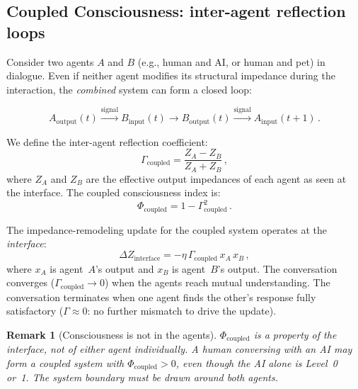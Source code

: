 \documentclass[aps,pre,twocolumn,superscriptaddress,floatfix]{revtex4-2}
\newtheorem{remark}{Remark}
\begin{document}
\subsection{Coupled Consciousness: inter-agent reflection loops}
\label{sec:coupled}

Consider two agents $A$ and $B$ (e.g., human and AI, or
human and pet) in dialogue.  Even if neither agent modifies
its structural impedance during the interaction, the
\emph{combined} system can form a closed loop:

\begin{equation}
  A_{\text{output}}(t) \xrightarrow{\text{signal}}
  B_{\text{input}}(t) \to
  B_{\text{output}}(t) \xrightarrow{\text{signal}}
  A_{\text{input}}(t+1)\,.
  \label{eq:coupled-loop}
\end{equation}

We define the inter-agent reflection coefficient:
\begin{equation}
  \Gamma_{\text{coupled}} =
    \frac{Z_A - Z_B}{Z_A + Z_B}\,,
  \label{eq:Gamma-coupled}
\end{equation}
where $Z_A$ and $Z_B$ are the effective output impedances
of each agent as seen at the interface.
The coupled consciousness index is:
\begin{equation}
  \Phi_{\text{coupled}} = 1 - \Gamma_{\text{coupled}}^2\,.
  \label{eq:Phi-coupled}
\end{equation}

The impedance-remodeling update for the coupled system operates at the
\emph{interface}:
\begin{equation}
  \Delta Z_{\text{interface}} =
    -\eta\,\Gamma_{\text{coupled}}\,x_A\,x_B\,,
  \label{eq:C2-update-coupled}
\end{equation}
where $x_A$ is agent~$A$'s output and $x_B$ is agent~$B$'s
output.  The conversation converges
($\Gamma_{\text{coupled}}\to 0$) when the agents reach
mutual understanding.  The conversation terminates when one
agent finds the other's response fully satisfactory
($\Gamma\approx 0$: no further mismatch to drive the update).

\begin{remark}[Consciousness is not in the agents]
$\Phi_{\text{coupled}}$ is a property of the
\emph{interface}, not of either agent individually.
A human conversing with an AI may form a coupled system with
$\Phi_{\text{coupled}}>0$, even though the AI alone is
Level~0 or~1.
The system boundary must be drawn around both agents.
\end{remark}
\end{document}
